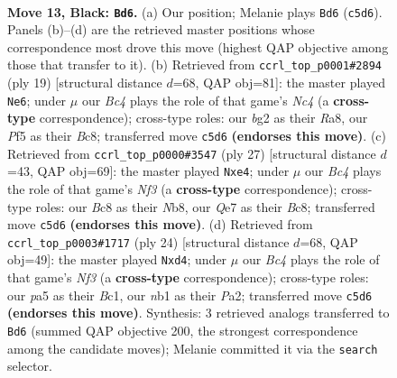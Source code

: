 \documentclass[11pt]{article}
\begin{document}
\clearpage

\begin{figure}[p]\centering
\begin{subfigure}{0.46\textwidth}\centering
\resizebox{\linewidth}{!}{%
\newchessgame
\chessboard[
  setfen={r1b2rk1/pp2q1pp/n4n2/P1bp1p1P/8/4PNP1/1P3PB1/RNBQ1RK1 b - - 0 13},
  showmover=false,
  pgfstyle=straightmove, color=movearrow, markmove={c5-d6}
]}
\caption{}
\end{subfigure}\hfill
\begin{subfigure}{0.46\textwidth}\centering
\resizebox{\linewidth}{!}{%
\newchessgame
\chessboard[
  setfen={r1bq1rk1/pp2bppp/2pp1n2/P1n5/2P1PB2/3P1N2/1P2B1PP/RN1Q1RK1 b - - 0 10},
  showmover=false,
  pgfstyle=straightmove, color=movearrow, markmove={c5-e6}
]}
\caption{}
\end{subfigure}
\\[4pt]
\begin{subfigure}{0.46\textwidth}\centering
\resizebox{\linewidth}{!}{%
\newchessgame
\chessboard[
  setfen={rnbqr1k1/4bppp/p2p1n2/3P4/1p2P3/5N1P/NP2BPP1/R1BQ1RK1 b - - 1 14},
  showmover=false,
  pgfstyle=straightmove, color=movearrow, markmove={f6-e4}
]}
\caption{}
\end{subfigure}\hfill
\begin{subfigure}{0.46\textwidth}\centering
\resizebox{\linewidth}{!}{%
\newchessgame
\chessboard[
  setfen={r2qkb1r/pb1n1ppp/4p3/3nP3/Np1p4/3B1N2/PP3PPP/R1BQ1RK1 w kq - 0 13},
  showmover=false,
  pgfstyle=straightmove, color=movearrow, markmove={f3-d4}
]}
\caption{}
\end{subfigure}
\caption{\textbf{Move 13, Black: \texttt{Bd6}.} (a) Our position; Melanie plays \texttt{Bd6} (\texttt{c5d6}). Panels (b)--(d) are the retrieved master positions whose correspondence most drove this move (highest QAP objective among those that transfer to it). (b) Retrieved from \texttt{ccrl\_top\_p0001\#2894} (ply 19) [structural distance $d$=68, QAP obj=81]: the master played \texttt{Ne6}; under $\mu$ our \emph{Bc4} plays the role of that game's \emph{Nc4} (a \textbf{cross-type} correspondence); cross-type roles: our \emph{b}g2 as their \emph{R}a8, our \emph{P}f5 as their \emph{B}c8; transferred move \texttt{c5d6} \textbf{(endorses this move)}. (c) Retrieved from \texttt{ccrl\_top\_p0000\#3547} (ply 27) [structural distance $d$=43, QAP obj=69]: the master played \texttt{Nxe4}; under $\mu$ our \emph{Bc4} plays the role of that game's \emph{Nf3} (a \textbf{cross-type} correspondence); cross-type roles: our \emph{B}c8 as their \emph{N}b8, our \emph{Q}e7 as their \emph{B}c8; transferred move \texttt{c5d6} \textbf{(endorses this move)}. (d) Retrieved from \texttt{ccrl\_top\_p0003\#1717} (ply 24) [structural distance $d$=68, QAP obj=49]: the master played \texttt{Nxd4}; under $\mu$ our \emph{Bc4} plays the role of that game's \emph{Nf3} (a \textbf{cross-type} correspondence); cross-type roles: our \emph{p}a5 as their \emph{B}c1, our \emph{n}b1 as their \emph{P}a2; transferred move \texttt{c5d6} \textbf{(endorses this move)}. Synthesis: 3 retrieved analogs transferred to \texttt{Bd6} (summed QAP objective 200, the strongest correspondence among the candidate moves); Melanie committed it via the \texttt{search} selector.}

\end{figure}
\end{document}
